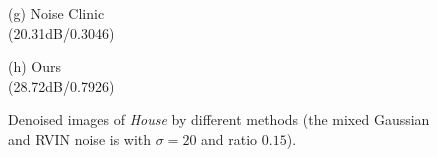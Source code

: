 \documentclass[runningheads]{llncs}
\begin{document}
\begin{figure}
{\begin{minipage}[t]{0.244\textwidth}
{\footnotesize (g) Noise Clinic \\(20.31dB/0.3046)}
\end{minipage}
\begin{minipage}[t]{0.244\textwidth}
\centering
{}
{\footnotesize (h) Ours \\(28.72dB/0.7926)}
\end{minipage}
}
\caption{Denoised images of \textsl{House} by different methods (the mixed Gaussian and RVIN noise is with $\sigma = 20$ and ratio $0.15$).}
\label{fig14}
\end{figure}
\end{document}
